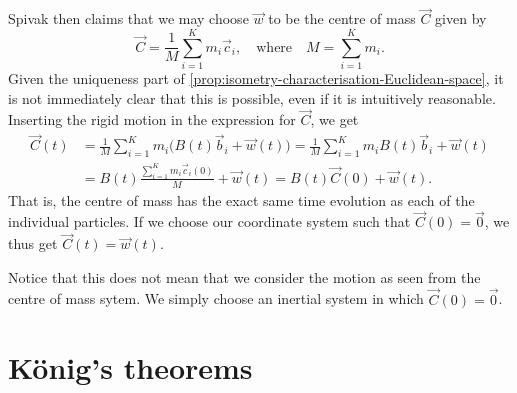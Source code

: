 \documentclass[article, a4paper, 11pt, oneside]{memoir}
\numberwithin{equation}{chapter}
\begin{document}
Spivak then claims that we may choose $\vec{w}$ to be the centre of mass $\vec{C}$ given by
%
\begin{equation*}
    \vec{C}
        = \frac{1}{M} \sum_{i=1}^K m_i \vec{c}_i,
        \quad \text{where} \quad
        M = \sum_{i=1}^K m_i.
\end{equation*}
%
Given the uniqueness part of \cref{prop:isometry-characterisation-Euclidean-space}, it is not immediately clear that this is possible, even if it is intuitively reasonable. Inserting the rigid motion in the expression for $\vec{C}$, we get
%
\begin{align*}
    \vec{C}(t)
        &= \frac{1}{M} \sum_{i=1}^K m_i \bigl( B(t) \vec{b}_i + \vec{w}(t) \bigr)
         = \frac{1}{M} \sum_{i=1}^K m_i B(t) \vec{b}_i + \vec{w}(t) \\
        &= B(t) \frac{ \sum_{i=1}^K m_i \vec{c}_i(0) }{M} + \vec{w}(t)
         = B(t) \vec{C}(0) + \vec{w}(t).
\end{align*}
%
That is, the centre of mass has the exact same time evolution as each of the individual particles. If we choose our coordinate system such that $\vec{C}(0) = \vec{0}$, we thus get $\vec{C}(t) = \vec{w}(t)$.

Notice that this does not mean that we consider the motion as seen from the centre of mass sytem. We simply choose an inertial system in which $\vec{C}(0) = \vec{0}$.


\section*{König's theorems}

\newcommand{\CM}{\mathrm{CM}}
\end{document}
